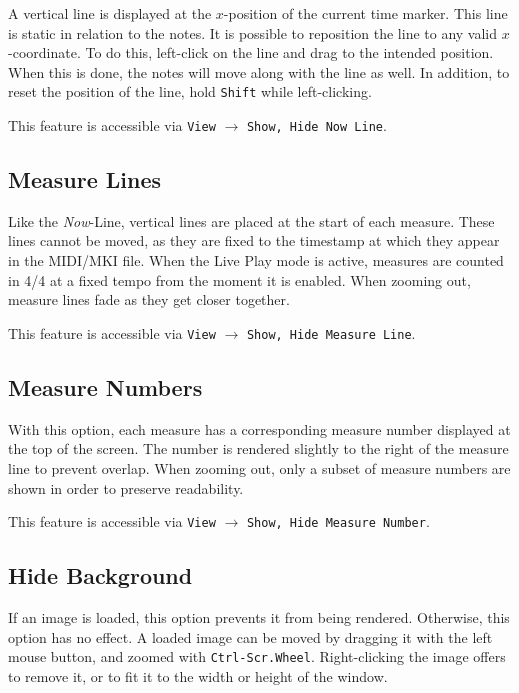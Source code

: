 \documentclass[english]{article}
\providecommand{\mi}[1]{\texttt{#1}}
\begin{document}
A vertical line is displayed at the $x$-position of the current time marker. This line is static in relation to the notes.
It is possible to reposition the line to any valid $x$-coordinate. To do this, left-click on the line and drag to the 
intended position. When this is done, the notes will move along with the line as well. In addition, to reset the position of
the line, hold \mi{Shift} while left-clicking.

This feature is accessible via 
\mi{View} $\rightarrow$ \mi{{Show, Hide} Now Line}.

\subsection{Measure Lines}

Like the \textit{Now}-Line, vertical lines are placed at the start of each measure. These lines cannot be moved, as 
they are fixed to the timestamp at which they appear in the MIDI/MKI file.
When the Live Play mode is active, measures are counted in 4/4 at a fixed tempo from the moment it is enabled.
When zooming out, measure lines fade as they get closer together.

This feature is accessible via 
\mi{View} $\rightarrow$ \mi{{Show, Hide} Measure Line}.

\subsection{Measure Numbers}

With this option, each measure has a corresponding measure number displayed at the top of the screen. The number is rendered
slightly to the right of the measure line to prevent overlap. When zooming out, only a subset of measure numbers are shown in
order to preserve readability.

This feature is accessible via 
\mi{View} $\rightarrow$ \mi{{Show, Hide} Measure Number}.

\subsection{Hide Background}

If an image is loaded, this option prevents it from being rendered. Otherwise, this option has no effect.
A loaded image can be moved by dragging it with the left mouse button, and zoomed with \mi{Ctrl-Scr.Wheel}.
Right-clicking the image offers to remove it, or to fit it to the width or height of the window.
\end{document}
